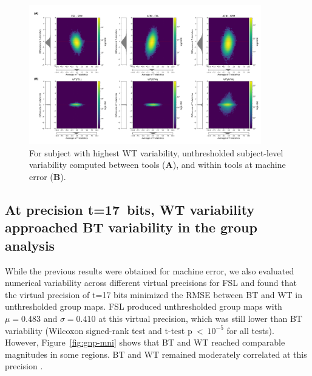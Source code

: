 \documentclass[11pt,onecolumn]{article}
\begin{document}
\begin{figure}[ht]
  \centering
  \includegraphics[width=0.9\textwidth]{figures/plots/Bland-Altman/unthresh-sbj05.png}
  \caption{For subject with highest WT variability,
    unthresholded subject-level variability computed between tools (\textbf{A}), and within tools at machine error (\textbf{B}).}
  \label{fig:unthresh-maps-sbj}
\end{figure}

\subsection{At precision t=17~bits, WT variability approached BT variability in the group analysis}

While the previous results were obtained for machine error, we also
evaluated numerical variability across different virtual precisions for FSL
and found that the virtual precision of t=17 bits minimized the RMSE
between BT and WT in unthresholded group maps.
FSL produced unthresholded group maps with $\mu=0.483$ and $\sigma=0.410$ at this virtual precision,
which was still lower than BT variability
(Wilcoxon signed-rank test and t-test p~\textless~$10^{-5}$ for all tests).
However, Figure~\ref{fig:gnp-mni} shows that
BT and WT reached comparable magnitudes in some regions. BT and WT remained
moderately correlated at this precision .
\end{document}
